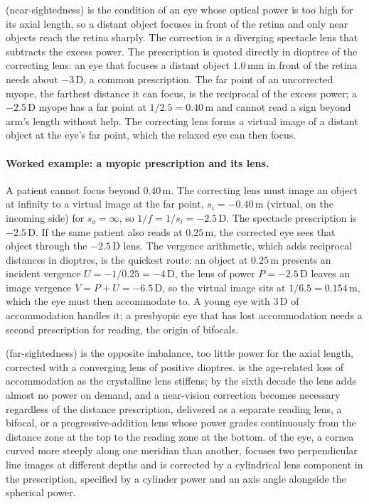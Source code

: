  (near-sightedness) is the condition of an eye whose optical
power is too high for its axial length, so a distant object focuses in front of
the retina and only near objects reach the retina sharply. The correction is a
diverging spectacle lens that subtracts the excess power. The prescription is
quoted directly in dioptres of the correcting lens: an eye that focuses a distant
object $1.0\,\si{\milli\meter}$ in front of the retina needs about
$-3\,\text{D}$, a common prescription. The far point of an uncorrected myope, the
farthest distance it can focus, is the reciprocal of the excess power; a
$-2.5\,\text{D}$ myope has a far point at $1/2.5 = 0.40\,\si{\meter}$ and cannot
read a sign beyond arm's length without help. The correcting lens forms a virtual
image of a distant object at the eye's far point, which the relaxed eye can then
focus.

\paragraph{Worked example: a myopic prescription and its lens.} A patient cannot
focus beyond $0.40\,\si{\meter}$. The correcting lens must image an object at
infinity to a virtual image at the far point, $s_i = -0.40\,\si{\meter}$ (virtual,
on the incoming side) for $s_o = \infty$, so $1/f = 1/s_i = -2.5\,\text{D}$. The
spectacle prescription is $-2.5\,\text{D}$. If the same patient also reads at
$0.25\,\si{\meter}$, the corrected eye sees that object through the
$-2.5\,\text{D}$ lens. The vergence arithmetic, which adds reciprocal distances
in dioptres, is the quickest route: an object at $0.25\,\si{\meter}$ presents an
incident vergence $U = -1/0.25 = -4\,\text{D}$, the lens of power
$P = -2.5\,\text{D}$ leaves an image vergence $V = P + U = -6.5\,\text{D}$, so
the virtual image sits at $1/6.5 = 0.154\,\si{\meter}$, which the eye must then
accommodate to. A young eye with $3\,\text{D}$ of accommodation handles it; a
presbyopic eye that has lost accommodation needs a second prescription for
reading, the origin of bifocals.

 (far-sightedness) is the opposite imbalance, too little power
for the axial length, corrected with a converging lens of positive dioptres.
 is the age-related loss of accommodation as the crystalline
lens stiffens; by the sixth decade the lens adds almost no power on demand, and a
near-vision correction becomes necessary regardless of the distance
prescription, delivered as a separate reading lens, a bifocal, or a
progressive-addition lens whose power grades continuously from the distance zone
at the top to the reading zone at the bottom.  of the eye,
a cornea curved more steeply along one meridian than another, focuses two
perpendicular line images at different depths and is corrected by a cylindrical
lens component in the prescription, specified by a cylinder power and an axis
angle alongside the spherical power.

